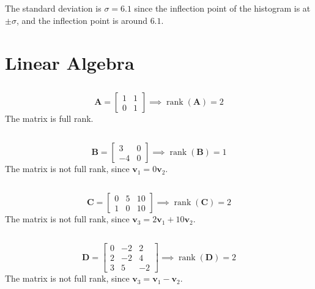 \documentclass{article}
\DeclareMathOperator{\rank}{rank}
\begin{document}
\subsection{}

The standard deviation is \(\sigma = 6.1\) since the inflection point of the histogram is at \(\pm \sigma\), and the inflection point is around \(6.1\).

\section{Linear Algebra}

\subsection{}

\begin{equation}
    \bm{A} =
    \begin{bmatrix}
        1 & 1 \\
        0 & 1
    \end{bmatrix} \implies \rank(\bm{A}) = 2
\end{equation}
The matrix is full rank.

\subsection{}

\begin{equation}
    \bm{B} =
    \begin{bmatrix}
        3 & 0 \\
        -4 & 0
    \end{bmatrix} \implies \rank(\bm{B}) = 1
\end{equation}
The matrix is not full rank, since \(\bm{v}_1 = 0\bm{v}_2\).

\subsection{}

\begin{equation}
    \bm{C} =
    \begin{bmatrix}
        0 & 5 & 10 \\
        1 & 0 & 10
    \end{bmatrix} \implies \rank(\bm{C}) = 2
\end{equation}
The matrix is not full rank, since \(\bm{v}_3 = 2\bm{v}_1 + 10\bm{v}_2\).

\subsection{}

\begin{equation}
    \bm{D} =
    \begin{bmatrix}
        0 & -2 & 2 \\
        2 & -2 & 4 \\
        3 & 5 & -2
    \end{bmatrix} \implies \rank(\bm{D}) = 2
\end{equation}
The matrix is not full rank, since \(\bm{v}_3 = \bm{v}_1 - \bm{v}_2\).
\end{document}
